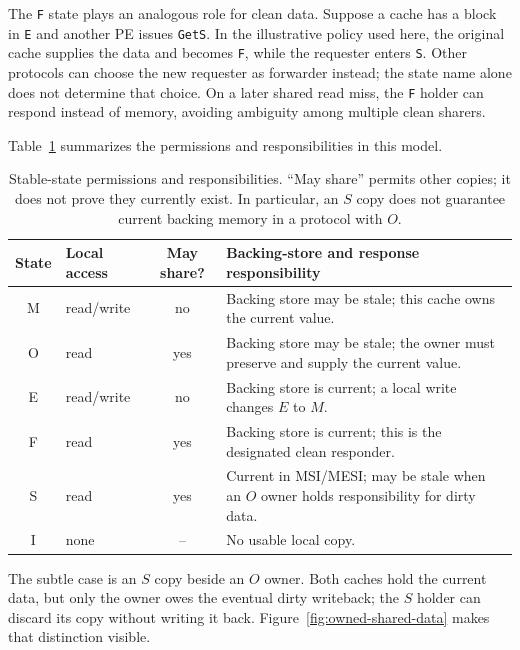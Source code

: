 The \texttt{F} state plays an analogous role for clean data.
Suppose a cache has a block in \texttt{E} and another PE issues \texttt{GetS}.
In the illustrative policy used here, the original cache supplies the data and becomes \texttt{F}, while the requester enters \texttt{S}.
Other protocols can choose the new requester as forwarder instead; the state name alone does not determine that choice.
On a later shared read miss, the \texttt{F} holder can respond instead of memory, avoiding ambiguity among multiple clean sharers.

Table~\ref{tab:mp-moesif-state-meanings} summarizes the permissions and responsibilities in this model.
\begin{table}[t]
    \centering
    \small
    \renewcommand{\arraystretch}{1.15}
    \begin{tabular}{|c|l|c|>{\raggedright\arraybackslash}p{3.0in}|}
        \hline
        State & Local access & May share? & Backing-store and response responsibility \\
        \hline
        M & read/write & no & Backing store may be stale; this cache owns the current value. \\
        \hline
        O & read & yes & Backing store may be stale; the owner must preserve and supply the current value. \\
        \hline
        E & read/write & no & Backing store is current; a local write changes $E$ to $M$. \\
        \hline
        F & read & yes & Backing store is current; this is the designated clean responder. \\
        \hline
        S & read & yes & Current in MSI/MESI; may be stale when an $O$ owner holds responsibility for dirty data. \\
        \hline
        I & none & -- & No usable local copy. \\
        \hline
    \end{tabular}
    \caption{Stable-state permissions and responsibilities. ``May share'' permits other copies; it does not prove they currently exist. In particular, an $S$ copy does not guarantee current backing memory in a protocol with $O$.}
    \label{tab:mp-moesif-state-meanings}
\end{table}

The subtle case is an $S$ copy beside an $O$ owner.
Both caches hold the current data, but only the owner owes the eventual dirty writeback; the $S$ holder can discard its copy without writing it back.
Figure~\ref{fig:owned-shared-data} makes that distinction visible.


